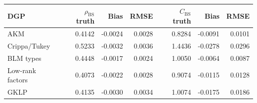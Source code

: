 \begin{tabular}{lrrrrrr}
\toprule
DGP & $\rho_{\mathrm{BS}}$ truth & Bias & RMSE & $C_{\mathrm{BS}}$ truth & Bias & RMSE \\
\midrule
AKM & 0.4142 & -0.0024 & 0.0028 & 0.8284 & -0.0091 & 0.0101 \\
Crippa/Tukey & 0.5233 & -0.0032 & 0.0036 & 1.4436 & -0.0278 & 0.0296 \\
BLM types & 0.4448 & -0.0017 & 0.0024 & 1.0050 & -0.0064 & 0.0087 \\
Low-rank factors & 0.4073 & -0.0022 & 0.0028 & 0.9074 & -0.0115 & 0.0128 \\
GKLP & 0.4135 & -0.0030 & 0.0034 & 1.0074 & -0.0175 & 0.0186 \\
\bottomrule
\end{tabular}

